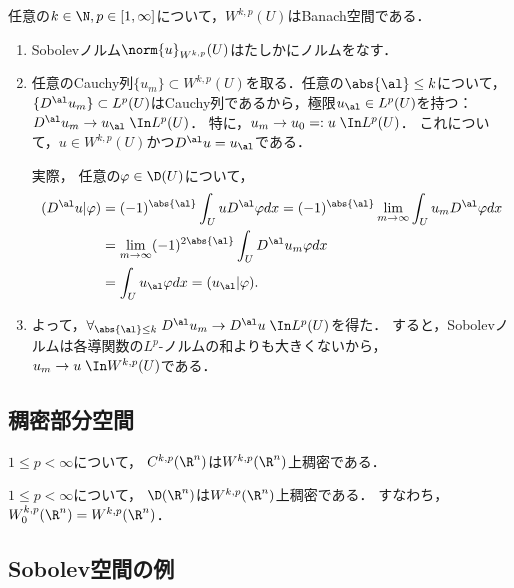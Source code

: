 \documentclass[uplatex,dvipdfmx]{jsreport}
\begin{document}
\begin{theorem}
    任意の$k\in\N,p\in[1,\infty]$について，$W^{k,p}(U)$はBanach空間である．
\end{theorem}
\begin{Proof}\mbox{}
    \begin{enumerate}[{Step}1]
        \item Sobolevノルム$\norm{u}_{W^{k,p}}(U)$はたしかにノルムをなす．
        \item 任意のCauchy列$\{u_m\}\subset W^{k,p}(U)$を取る．任意の$\abs{\al}\le k$について，$\{D^\al u_m\}\subset L^p(U)$はCauchy列であるから，極限$u_\al\in L^p(U)$を持つ：$D^\al u_m\to u_\al\;\In L^p(U)$．
        特に，$u_m\to u_0=:u\;\In L^p(U)$．
        これについて，$u\in W^{k,p}(U)$かつ$D^\al u=u_\al$である．

        実際，
        任意の$\varphi\in\D(U)$について，
        \begin{align*}
            (D^\al u|\varphi)&=(-1)^{\abs{\al}}\int_UuD^\al\varphi dx=(-1)^{\abs{\al}}\lim_{m\to\infty}\int_Uu_mD^\al\varphi dx\\
            &=\lim_{m\to\infty}(-1)^{2\abs{\al}}\int_UD^\al u_m\varphi dx\\
            &=\int_Uu_\al\varphi dx=(u_\al|\varphi).
        \end{align*}
        \item よって，$\forall_{\abs{\al}\le k}\;D^\al u_m\to D^\al u\;\In L^p(U)$を得た．
        すると，Sobolevノルムは各導関数の$L^p$-ノルムの和よりも大きくないから，
        $u_m\to u\;\In W^{k,p}(U)$である．
    \end{enumerate}
\end{Proof}

\subsection{稠密部分空間}

\begin{theorem}
    $1\le p<\infty$について，
    $C^{k,p}(\R^n)$は$W^{k,p}(\R^n)$上稠密である．
\end{theorem}

\begin{theorem}
    $1\le p<\infty$について，
    $\D(\R^n)$は$W^{k,p}(\R^n)$上稠密である．
    すなわち，$W^{k,p}_0(\R^n)=W^{k,p}(\R^n)$．
\end{theorem}

\subsection{Sobolev空間の例}
\end{document}

